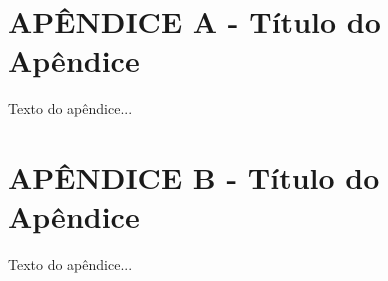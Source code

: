
\chapter{APÊNDICE A - Título do Apêndice}
\label{apendice:a}

Texto do apêndice...

\chapter{APÊNDICE B - Título do Apêndice}
\label{apendice:b}

Texto do apêndice...

